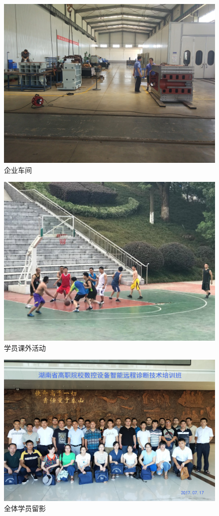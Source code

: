 \documentclass[12pt,a4paper]{ctexart}
\begin{document}
\begin{figure}[h]
	\begin{center}
		\includegraphics[width=0.8\linewidth]{image/10}
		\caption{企业车间 }
	\end{center}
\end{figure}

\begin{figure}[h]
	\begin{center}
		\includegraphics[width=0.8\linewidth]{image/11}
		\caption{学员课外活动 }
	\end{center}
\end{figure}

\begin{figure}[h]
	\begin{center}
		\includegraphics[width=0.8\linewidth]{image/12}
		\caption{全体学员留影}
	\end{center}
\end{figure}
\end{document}
